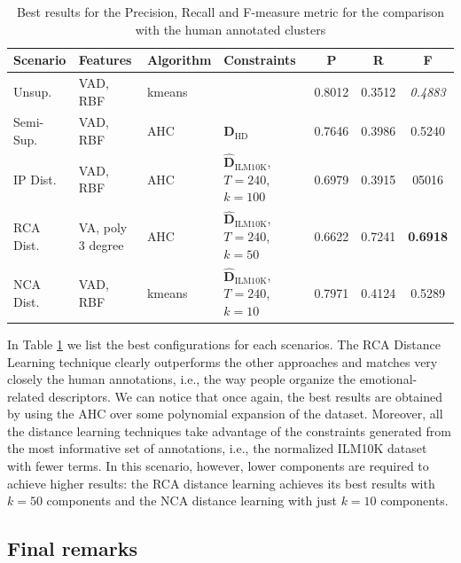 \begin{table}[tb]
	
	\caption{Best results for the Precision, Recall and F-measure metric for the comparison with the human annotated clusters }
	\label{tab:ANEWf_measure}
\begin{center}
  \bgroup
  \def\arraystretch{1.5}
\begin{tabular}{ ||l |l| l |p{} |c  |c|c||}
\hline
\hline
Scenario    & Features    &  Algorithm  & Constraints     & P   & R   & F \\
\hline
\hline
Unsup.  & VAD, RBF & kmeans     &          &  0.8012 & 0.3512 & {\color[HTML]{8E0000} \textit{0.4883}} \\
\hline
Semi-Sup. & VAD, RBF & AHC    & $\mathbf{{D}}_{\text{HD}}$     & 0.7646 & 0.3986 & 0.5240 \\
\hline
IP Dist. & VAD, RBF & AHC     & $\mathbf{\hat{D}}_{\text{ILM10K}}$, $T=240$,$\quad \;$ $k=100$ & 0.6979 & 0.3915 & 05016 \\
\hline
RCA Dist. & VA, poly 3 degree & AHC & $\mathbf{\hat{D}}_{\text{ILM10K}}$, $T=240$,$\quad \;$ $k=50$ & 0.6622 & 0.7241 & {\color[HTML]{326B00}  \textbf{0.6918}} \\
\hline
NCA Dist.& VAD, RBF & kmeans & $\mathbf{\hat{D}}_{\text{ILM10K}}$, $T=240$,$\quad \;$ $k=10$ & 0.7971 & 0.4124 & 0.5289  \\
\hline
\hline
\end{tabular}\quad
\egroup
\end{center}
\end{table}

In Table \ref{tab:ANEWf_measure} we list the best configurations for each scenarios. The RCA Distance Learning technique clearly outperforms the other approaches and matches very closely the human annotations, i.e., the way people organize the emotional-related descriptors. We can notice that once again, the best results are obtained by using the AHC over some polynomial expansion of the dataset. Moreover, all the distance learning techniques take advantage of the constraints generated from the most informative set of annotations, i.e., the normalized ILM10K dataset with fewer terms. In this scenario, however, lower components are required to achieve higher results: the RCA distance learning achieves its best results with $k=50$ components and the NCA distance learning with just $k=10$ components.

\subsection{Final remarks}\label{sec:ANEW:conclusions}

